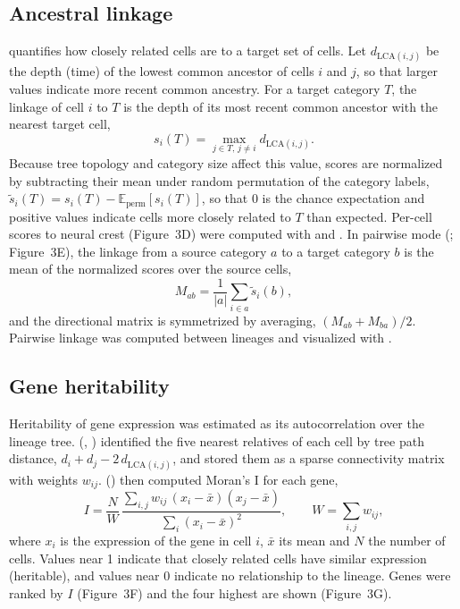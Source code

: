 \subsection*{Ancestral linkage}
 quantifies how closely related cells are to a target set of cells. Let $d_{\mathrm{LCA}(i,j)}$ be the depth (time) of the lowest common ancestor of cells $i$ and $j$, so that larger values indicate more recent common ancestry. For a target category $T$, the linkage of cell $i$ to $T$ is the depth of its most recent common ancestor with the nearest target cell,
\begin{equation}
  s_i(T) = \max_{j \in T,\, j \neq i} d_{\mathrm{LCA}(i,j)} .
\end{equation}
Because tree topology and category size affect this value, scores are normalized by subtracting their mean under random permutation of the category labels, $\tilde{s}_i(T) = s_i(T) - \mathbb{E}_{\mathrm{perm}}[s_i(T)]$, so that 0 is the chance expectation and positive values indicate cells more closely related to $T$ than expected. Per-cell scores to neural crest (Figure~3D) were computed with  and . In pairwise mode (; Figure~3E), the linkage from a source category $a$ to a target category $b$ is the mean of the normalized scores over the source cells,
\begin{equation}
  M_{ab} = \frac{1}{|a|} \sum_{i \in a} \tilde{s}_i(b),
\end{equation}
and the directional matrix is symmetrized by averaging, $(M_{ab} + M_{ba})/2$. Pairwise linkage was computed between lineages and visualized with .

\subsection*{Gene heritability}
Heritability of gene expression was estimated as its autocorrelation over the lineage tree.  (, ) identified the five nearest relatives of each cell by tree path distance, $d_i + d_j - 2\,d_{\mathrm{LCA}(i,j)}$, and stored them as a sparse connectivity matrix with weights $w_{ij}$.  () then computed Moran's I for each gene,
\begin{equation}
  I = \frac{N}{W}\,\frac{\sum_{i,j} w_{ij}\,(x_i - \bar{x})(x_j - \bar{x})}{\sum_i (x_i - \bar{x})^2},
  \qquad W = \sum_{i,j} w_{ij},
\end{equation}
where $x_i$ is the expression of the gene in cell $i$, $\bar{x}$ its mean and $N$ the number of cells. Values near 1 indicate that closely related cells have similar expression (heritable), and values near 0 indicate no relationship to the lineage. Genes were ranked by $I$ (Figure~3F) and the four highest are shown (Figure~3G).

